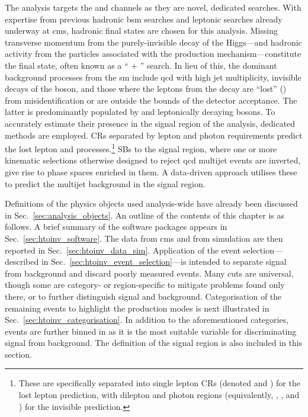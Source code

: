 The analysis targets the \ttH and \VH channels as they are novel, dedicated searches. With expertise from previous hadronic \acrshort{bsm} searches and leptonic \higgstoinv searches already underway at \acrshort{cms}, hadronic final states are chosen for this analysis. Missing transverse momentum from the purely-invisible decay of the Higgs---and hadronic activity from the particles associated with the production mechanism---constitute the final state, often known as a `` $+$ \ptvecmiss'' search. In lieu of this, the dominant background processes from the \acrlong{sm} include \acrshort{qcd} with high \gls{jet} multiplicity, invisible decays of the \PZ boson, and those where the leptons from the decay are ``lost'' (\lostlepton) from misidentification or are outside the bounds of the detector acceptance. The latter is predominantly populated by \ttbar and leptonically decaying \PW bosons. To accurately estimate their presence in the signal region of the analysis, dedicated methods are employed. \Glspl{CR} separated by lepton and photon requirements predict the lost lepton and \ztonunu processes.\footnote{These are specifically separated into single lepton \glspl{CR} (denoted \singleMuCr and \singleEleCr) for the lost lepton prediction, with dilepton and photon regions (equivalently, \doubleMuCr, \doubleEleCr, and \singlePhotonCr) for the invisible \PZ prediction.} \Glspl{SB} to the signal region, where one or more kinematic selections otherwise designed to reject \acrshort{qcd} multijet events are inverted, give rise to phase spaces enriched in them. A data-driven approach utilises these to predict the multijet background in the signal region.

Definitions of the physics objects used analysis-wide have already been discussed in Sec.~\ref{sec:analysis_objects}. An outline of the contents of this chapter is as follows. A brief summary of the software packages appears in Sec.~\ref{sec:htoinv_software}. The data from \acrshort{cms} and from simulation are then reported in Sec.~\ref{sec:htoinv_data_sim}. Application of the event selection---described in Sec.~\ref{sec:htoinv_event_selection}---is intended to separate signal from background and discard poorly measured events. Many cuts are universal, though some are category- or region-specific to mitigate problems found only there, or to further distinguish signal and background. Categorisation of the remaining events to highlight the production modes is next illustrated in Sec.~\ref{sec:htoinv_categorisation}. In addition to the aforementioned categories, events are further binned in \ptmiss as it is the most suitable variable for discriminating signal from background. The definition of the signal region is also included in this section.


